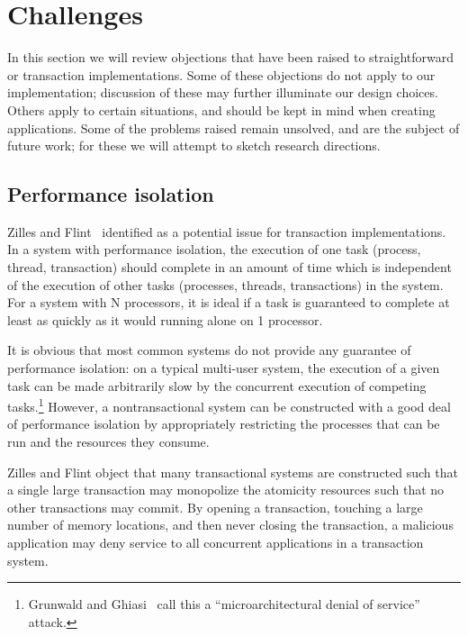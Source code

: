\chapter{Challenges}\label{cha:chall}

In this section we will review objections that have been raised to
straightforward or \naive transaction implementations.
Some of these objections do not apply to our implementation;
discussion of these may further illuminate our design choices.
Others apply to certain situations, and should be kept in mind when
creating applications.  Some of the problems raised remain unsolved,
and are the subject of future work; for these we will attempt to sketch
research directions.

\section{Performance isolation}
Zilles and Flint~\cite{ZillesFl05} identified
 as a potential issue for
transaction implementations.  In a system with performance isolation,
the execution of one task (process, thread, transaction) should
complete in an amount of time which is independent of the execution of
other tasks (processes, threads, transactions) in the system.  For
a system with N processors, it is ideal if a task is guaranteed to
complete at least as quickly as it would running alone on 1
processor.

It is obvious that most common systems do not provide any guarantee of
performance isolation: on a typical multi-user system, the execution
of a given task can be made arbitrarily slow by the concurrent
execution of competing tasks.\footnote{Grunwald and
  Ghiasi~\cite{GrunwaldGh02} call this a ``microarchitectural denial
  of service'' attack.}
However, a nontransactional system can
be constructed with a good deal of performance isolation by
appropriately restricting the processes that can be run and the
resources they consume.

Zilles and Flint object that many transactional systems are
constructed such that a single large transaction may monopolize the
atomicity resources such that no other transactions may commit.  By
opening a transaction, touching a large number of memory locations,
and then never closing the transaction, a malicious application may
deny service to all concurrent applications in a transaction system.

